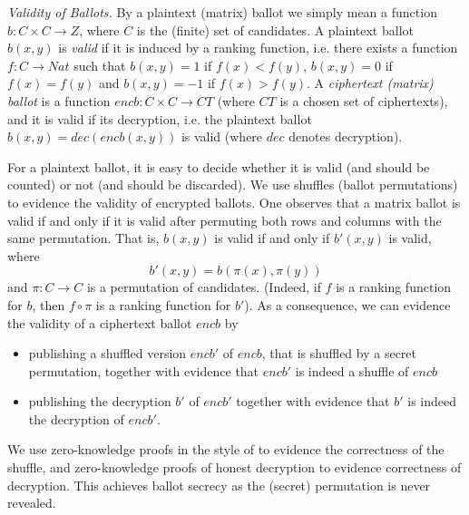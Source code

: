 \smallskip\noindent\emph{Validity of Ballots.} By a plaintext
(matrix) ballot
we simply mean a function $b: C \times C \to Z$,
where $C$ is the (finite) set of candidates. A 
plaintext ballot $b(x, y)$ 
is \emph{valid} if it is induced by a ranking function, i.e.
there exists a function $f: C \to Nat$ such that $b(x, y) = 1$ if
$f(x) < f(y)$, $b(x, y) = 0$ if $f(x) = f(y)$ and $b(x, y) = -1$ if
$f(x) > f(y)$. A \emph{ciphertext (matrix) ballot} is a function
$encb: C \times C \to CT$ (where $CT$ is a chosen set of
ciphertexts), and it is valid if its decryption,  i.e. the plaintext
ballot $b(x, y)  = dec(encb(x, y))$ is valid (where $dec$ denotes
decryption).

For a plaintext ballot, it is easy to decide whether it is
valid (and should be counted) or not (and should be discarded). We
use shuffles (ballot permutations) to evidence the validity of
encrypted ballots. One observes that a matrix ballot is valid if and
only if it is valid after permuting both rows and columns with the
same permutation. That is, $b(x,y)$ is valid if and only if $b'(x,y)$
is valid, where
\[ b'(x,y) = b(\pi(x), \pi(y)) \]
and $\pi: C \to C$ is a permutation of candidates. (Indeed, if $f$
is a ranking function for $b$, then $f \circ \pi$ is a ranking
function for $b'$). As a consequence, we can evidence the validity
of a ciphertext ballot $encb$ by
\begin{itemize}
  \item publishing a shuffled version $encb'$ of $encb$, that is
  shuffled by a secret permutation, together with
  evidence that $encb'$ is indeed a shuffle of $encb$
  \item publishing the decryption $b'$ of $encb'$ together with
  evidence that $b'$ is indeed the decryption of $encb'$.
\end{itemize}

\noindent
We use zero-knowledge proofs in the style of \citep{DBLP:conf/africacrypt/TereliusW10}
to evidence the correctness of the shuffle, and zero-knowledge
proofs of honest decryption \citep{DBLP:conf/crypto/ChaumP92} to evidence
correctness of decryption. This achieves ballot secrecy as
the (secret) permutation is never revealed.

